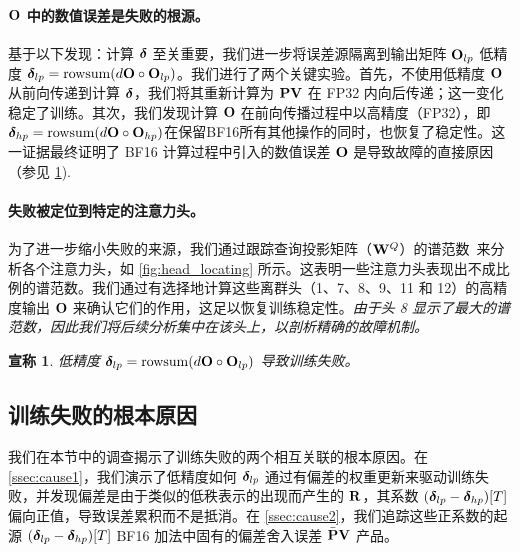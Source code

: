 \documentclass{article} %
\newtheorem{claim}{宣称}
\begin{document}
\vspace{-10pt}
\paragraph{${\mathbf{O}}$ 中的数值误差是失败的根源。}
基于以下发现：计算 ${\boldsymbol{\delta}}$ 至关重要，我们进一步将误差源隔离到输出矩阵 ${\mathbf{O}}_{lp}$ 低精度 ${\boldsymbol{\delta}}_{lp} = \mathrm{rowsum}(d{\mathbf{O}} \circ {\mathbf{O}}_{lp})$。我们进行了两个关键实验。首先，不使用低精度 ${\mathbf{O}}$ 从前向传递到计算 ${\boldsymbol{\delta}}$，我们将其重新计算为 ${\mathbf{P}}{\mathbf{V}}$ 在 FP32 内向后传递；这一变化稳定了训练。其次，我们发现计算 ${\mathbf{O}}$ 在前向传播过程中以高精度（FP32），即 ${\boldsymbol{\delta}}_{hp} = \mathrm{rowsum}(d{\mathbf{O}} \circ {\mathbf{O}}_{hp})$在保留BF16所有其他操作的同时，也恢复了稳定性。这一证据最终证明了 BF16 计算过程中引入的数值误差 ${\mathbf{O}}$ 是导致故障的直接原因（参见 \cref{claim1}).


\vspace{-10pt}
\paragraph{失败被定位到特定的注意力头。}为了进一步缩小失败的来源，我们通过跟踪查询投影矩阵（${\mathbf{W}}^Q$）的谱范数~\citep{yang2023spectral,rybakov2024methods}来分析各个注意力头，如 \cref{fig:head_locating} 所示。这表明一些注意力头表现出不成比例的谱范数。我们通过有选择地计算这些离群头（1、7、8、9、11 和 12）的高精度输出 ${\mathbf{O}}$ 来确认它们的作用，这足以恢复训练稳定性。\emph{由于头 8 显示了最大的谱范数，因此我们将后续分析集中在该头上，以剖析精确的故障机制。}


\begin{tcolorbox}[
  colback=cyan!5!white,
  colframe=black!100,
  boxrule=0.4pt,
  arc=3pt,
  left=5pt, right=5pt,
  top=5pt, bottom=5pt,
  width=0.95\linewidth,
  coltitle=black,
  center
]
\begin{claim}\label{claim1}
低精度 ${\boldsymbol{\delta}}_{lp} = \mathrm{rowsum}(d{\mathbf{O}} \circ {\mathbf{O}}_{lp})$ 导致训练失败。
\end{claim}
\end{tcolorbox}



\subsection{训练失败的根本原因}\label{ssec:root_cause}


我们在本节中的调查揭示了训练失败的两个相互关联的根本原因。在 \cref{ssec:cause1}，我们演示了低精度如何 ${\boldsymbol{\delta}}_{lp}$ 通过有偏差的权重更新来驱动训练失败，并发现偏差是由于类似的低秩表示的出现而产生的 ${\mathbf{R}}$，其系数 $({\boldsymbol{\delta}}_{lp} - {\boldsymbol{\delta}}_{hp})[T]$ 偏向正值，导致误差累积而不是抵消。在 \cref{ssec:cause2}，我们追踪这些正系数的起源 $({\boldsymbol{\delta}}_{lp} - {\boldsymbol{\delta}}_{hp})[T]$ BF16 加法中固有的偏差舍入误差 $\bar{{\mathbf{P}}}{\mathbf{V}}$ 产品。
\end{document}
